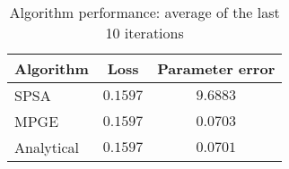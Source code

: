 \begin{table}[H]
    \centering
    \begin{tabular}{lcc}
    \toprule
    \textbf{Algorithm} & \textbf{Loss} & \textbf{Parameter error} \\
    \midrule
    SPSA & $0.1597$ & $9.6883$ \\
MPGE & $0.1597$ & $0.0703$ \\
Analytical & $0.1597$ & $0.0701$ \\
\bottomrule
    \end{tabular}
    \caption{Algorithm performance: average of the last 10 iterations}
    \end{table}